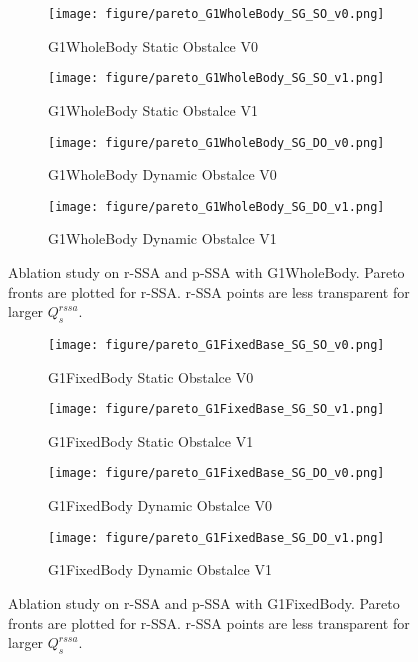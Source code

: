 \begin{figure*}[htbp]
    \centering
    
    \begin{subfigure}[b]{0.24\textwidth}
        \texttt{[image: figure/pareto\_G1WholeBody\_SG\_SO\_v0.png]}
        \caption{G1WholeBody Static Obstalce V0}
        \label{fig:pareto_G1WholeBody_SG_SO_v0}
    \end{subfigure}
    \begin{subfigure}[b]{0.24\textwidth}
        \texttt{[image: figure/pareto\_G1WholeBody\_SG\_SO\_v1.png]}
        \caption{G1WholeBody Static Obstalce V1}
        \label{fig:pareto_G1WholeBody_SG_SO_v1}
    \end{subfigure}
    \begin{subfigure}[b]{0.24\textwidth}
        \texttt{[image: figure/pareto\_G1WholeBody\_SG\_DO\_v0.png]}
        \caption{G1WholeBody Dynamic Obstalce V0}
        \label{fig:pareto_G1WholeBody_SG_DO_v0}
    \end{subfigure}
    \begin{subfigure}[b]{0.24\textwidth}
        \texttt{[image: figure/pareto\_G1WholeBody\_SG\_DO\_v1.png]}
        \caption{G1WholeBody Dynamic Obstalce V1}
        \label{fig:pareto_G1WholeBody_SG_DO_v1}
    \end{subfigure}
    \caption{Ablation study on r-SSA and p-SSA with G1WholeBody. Pareto fronts are plotted for r-SSA. r-SSA points are less transparent for larger $Q^{rssa}_s$.}
    \label{fig: ablation_study_whole}
\end{figure*}

\begin{figure*}[htbp]
    \centering
    
    \begin{subfigure}[b]{0.24\textwidth}
        \texttt{[image: figure/pareto\_G1FixedBase\_SG\_SO\_v0.png]}
        \caption{G1FixedBody Static Obstalce V0}
        \label{fig:pareto_G1FixedBase_SG_SO_v0}
    \end{subfigure}
    \begin{subfigure}[b]{0.24\textwidth}
        \texttt{[image: figure/pareto\_G1FixedBase\_SG\_SO\_v1.png]}
        \caption{G1FixedBody Static Obstalce V1}
        \label{fig:pareto_G1FixedBase_SG_SO_v1}
    \end{subfigure}
    \begin{subfigure}[b]{0.24\textwidth}
        \texttt{[image: figure/pareto\_G1FixedBase\_SG\_DO\_v0.png]}
        \caption{G1FixedBody Dynamic Obstalce V0}
        \label{fig:pareto_G1FixedBase_SG_DO_v0}
    \end{subfigure}
    \begin{subfigure}[b]{0.24\textwidth}
        \texttt{[image: figure/pareto\_G1FixedBase\_SG\_DO\_v1.png]}
        \caption{G1FixedBody Dynamic Obstalce V1}
        \label{fig:pareto_G1FixedBase_SG_DO_v1}
    \end{subfigure}
    \caption{Ablation study on r-SSA and p-SSA with G1FixedBody. Pareto fronts are plotted for r-SSA. r-SSA points are less transparent for larger $Q^{rssa}_s$.}
    \label{fig: ablation_study_fixed}
\end{figure*}